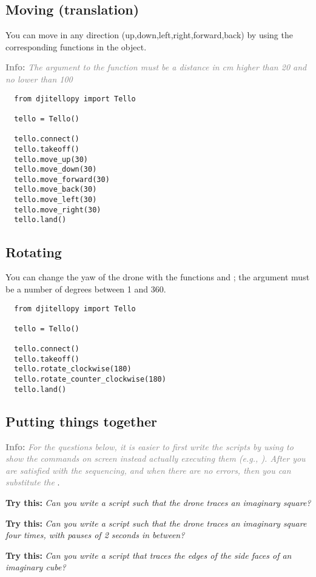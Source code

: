 \documentclass[12pt]{article}
\newcommand{\textsfbf}[1]{\textsf{\textbf{#1}}}
\newcommand{\info}[1]{\par\textcolor{gray}{\textsfbf{Info:} \emph{#1}}}
\newcommand{\trythis}[1]{\par\textcolor{DodgerBlue4}{\textsfbf{Try this:} \emph{#1}}}
\begin{document}
\subsection{Moving (translation)}
You can move in any direction (up,down,left,right,forward,back) by using the corresponding functions in the  object.
\info{The argument to the function must be a distance in \unit{cm} higher than 20 and no lower than 100}
\begin{lstlisting}
  from djitellopy import Tello

  tello = Tello()

  tello.connect()
  tello.takeoff()
  tello.move_up(30)
  tello.move_down(30)
  tello.move_forward(30)
  tello.move_back(30)
  tello.move_left(30)
  tello.move_right(30)
  tello.land()
\end{lstlisting}

\subsection{Rotating}
You can change the yaw of the drone with the functions  and ; the argument  must be a number of degrees between 1 and 360.

\begin{lstlisting}
  from djitellopy import Tello

  tello = Tello()

  tello.connect()
  tello.takeoff()
  tello.rotate_clockwise(180)
  tello.rotate_counter_clockwise(180)
  tello.land()
\end{lstlisting}

\subsection{Putting things together}
\info{For the questions below, it is easier to first write the scripts by using \var{print} to show the commands on screen instead actually executing them (e.g., \var{print('tello.move_up(50)')}). After you are satisfied with the sequencing, and when there are no errors, then you can substitute the \var{print}}.

\trythis{Can you write a script such that the drone traces an imaginary square?}
\trythis{Can you write a script such that the drone traces an imaginary square four times, with pauses of 2 seconds in between?}
\trythis{Can you write a script that traces the edges of the side faces of an imaginary cube?}
\end{document}
